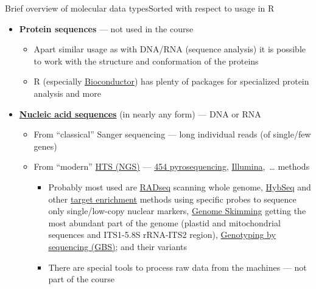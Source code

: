 \documentclass[compress, xelatex, 11pt, xcolor=svgnames, aspectratio=169,
	hyperref={
		bookmarks=true,
		unicode=true,
		colorlinks=true,
		pdftitle={Molecular data in R},
		plainpages=false,
		pdfauthor={Vojtech Zeisek},
		pdfsubject={Course about phylogeny and evolution in R},
		pdfcreator={XeLaTeX},
		pdfkeywords={R, evolution, phylogeny, molecular data},
		linkcolor=Crimson, %
		anchorcolor=Magenta, %
		citecolor=Magenta, %
		filecolor=Magenta, %
		menucolor=Magenta, %
		urlcolor=DodgerBlue, %
		},
	url={hyphens, lowtilde} %
	]{beamer}
\begin{document}
\begin{frame}[allowframebreaks]{Brief overview of molecular data types}{Sorted with respect to usage in R}
\begin{itemize}
\begin{itemize}
\begin{itemize}
				\item Simpler methods \href{https://en.wikipedia.org/wiki/Random_amplification_of_polymorphic_DNA}{RAPD} (Random Amplified Polymorphic DNA) and \href{https://en.wikipedia.org/wiki/Restriction_fragment_length_polymorphism}{PCR-RFLP} (Polymerase Chain Reaction-Restriction Fragment Length Polymorphism) are not used anymore at all
			\end{itemize}
		\end{itemize}
		\item \textbf{Protein sequences} --- not used in the course
		\begin{itemize}
			\item Apart similar usage as with DNA/RNA (sequence analysis) it is possible to work with the structure and conformation of the proteins
			\item R (especially \href{https://bioconductor.org/}{Bioconductor}) has plenty of packages for specialized protein analysis and more
		\end{itemize}
		\item \textbf{\href{https://en.wikipedia.org/wiki/Nucleic_acid_sequence}{Nucleic acid sequences}} (in nearly any form) --- DNA or RNA
		\begin{itemize}
			\item From \enquote{classical} Sanger sequencing --- long individual reads (of single/few genes)
			\item From \enquote{modern} \href{https://en.wikipedia.org/wiki/DNA_sequencing\#High-throughput_methods}{HTS (NGS)} --- \href{https://en.wikipedia.org/wiki/Pyrosequencing}{454 pyrosequencing}, \href{https://en.wikipedia.org/wiki/Illumina_dye_sequencing}{Illumina},~\ldots{ }methods
			\begin{itemize}
				\item Probably most used are \href{https://en.wikipedia.org/wiki/Restriction_site_associated_DNA_markers}{RADseq} scanning whole genome, \href{https://bsapubs.onlinelibrary.wiley.com/doi/abs/10.3732/apps.1400042}{HybSeq} and other \href{https://en.wikipedia.org/wiki/Exome_sequencing}{target enrichment} methods using specific probes to sequence only single/low-copy nuclear markers, \href{https://bsapubs.onlinelibrary.wiley.com/doi/abs/10.3732/ajb.1100335}{Genome Skimming} getting the most abundant part of the genome (plastid and mitochondrial sequences and ITS1-5.8S rRNA-ITS2 region), \href{https://en.wikipedia.org/wiki/Genotyping_by_sequencing}{Genotyping by sequencing (GBS)}; and their variants
				\item There are special tools to process raw data from the machines --- not part of the course

\end{itemize}
\end{itemize}
\end{itemize}
\end{frame}
\end{document}
